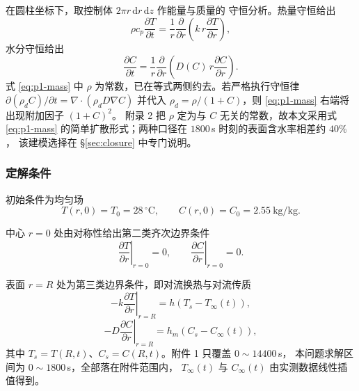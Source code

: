 \documentclass[12pt,a4paper]{ctexart}
\begin{document}
在圆柱坐标下，取控制体 $2\pi r\,\mathrm{d}r\,\mathrm{d}z$ 作能量与质量的
守恒分析。热量守恒给出
\begin{equation}
  \rho c_p\frac{\partial T}{\partial t}
  =\frac{1}{r}\frac{\partial}{\partial r}
   \left(k\,r\frac{\partial T}{\partial r}\right),
  \label{eq:p1-heat}
\end{equation}
水分守恒给出
\begin{equation}
  \frac{\partial C}{\partial t}
  =\frac{1}{r}\frac{\partial}{\partial r}
   \left(D(C)\,r\frac{\partial C}{\partial r}\right).
  \label{eq:p1-mass}
\end{equation}
式 \eqref{eq:p1-mass} 中 $\rho$ 为常数，已在等式两侧约去。若严格执行守恒律
$\partial(\rho_d C)/\partial t=\nabla\!\cdot\!(\rho_d D\nabla C)$ 并代入
$\rho_d=\rho/(1+C)$，则 \eqref{eq:p1-mass} 右端将出现附加因子 $(1+C)^2$。
附录 2 把 $\rho$ 定为与 $C$ 无关的常数，故本文采用式 \eqref{eq:p1-mass}
的简单扩散形式；两种口径在 $1800$\,s 时刻的表面含水率相差约 $40\%$，
该建模选择在 §\ref{sec:closure} 中专门说明。

\subsubsection{定解条件}

初始条件为均匀场
\begin{equation}
  T(r,0)=T_0=28\,^\circ\mathrm{C},\qquad
  C(r,0)=C_0=2.55\ \mathrm{kg/kg}.
  \label{eq:p1-ic}
\end{equation}

中心 $r=0$ 处由对称性给出第二类齐次边界条件
\begin{equation}
  \left.\frac{\partial T}{\partial r}\right|_{r=0}=0,\qquad
  \left.\frac{\partial C}{\partial r}\right|_{r=0}=0 .
  \label{eq:p1-center}
\end{equation}

表面 $r=R$ 处为第三类边界条件，即对流换热与对流传质
\begin{equation}
  -k\left.\frac{\partial T}{\partial r}\right|_{r=R}
  =h\left(T_s-T_\infty(t)\right),
  \label{eq:p1-bc-heat}
\end{equation}
\begin{equation}
  -D\left.\frac{\partial C}{\partial r}\right|_{r=R}
  =h_m\left(C_s-C_\infty(t)\right),
  \label{eq:p1-bc-mass}
\end{equation}
其中 $T_s=T(R,t)$、$C_s=C(R,t)$。附件 1 只覆盖 $0\sim14400$\,s，
本问题求解区间为 $0\sim1800$\,s，全部落在附件范围内，
$T_\infty(t)$ 与 $C_\infty(t)$ 由实测数据线性插值得到。
\end{document}
